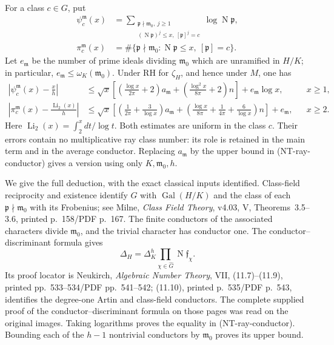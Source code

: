\documentclass[11pt,a4paper]{article}
\begin{document}
For a class $c\in G$, put
\begin{align*}
 \psi_c^{\mathfrak m}(x)
 &=\sum_{\substack{\mathfrak p\nmid\mathfrak m_0,\ j\ge1\\
           (\operatorname N\mathfrak p)^j\le x,\ [\mathfrak p]^j=c}}
                  \log\operatorname N\mathfrak p,\\
 \pi_c^{\mathfrak m}(x)
 &=\#\{\mathfrak p\nmid\mathfrak m_0:
             \operatorname N\mathfrak p\le x,\ [\mathfrak p]=c\}.
\end{align*}
Let $e_{\mathfrak m}$ be the number of prime ideals dividing
$\mathfrak m_0$ which are unramified in $H/K$; in particular,
$e_{\mathfrak m}\le\omega_K(\mathfrak m_0)$.
Under RH for $\zeta_H$, and hence under $M$, one has
\begin{align*}
 \left|\psi_c^{\mathfrak m}(x)-\frac{x}{h}\right|
 &\le\sqrt x\left[
       \left(\frac{\log x}{2\pi}+2\right)a_{\mathfrak m}
        +\left(\frac{\log^2x}{8\pi}+2\right)n\right]
       +e_{\mathfrak m}\log x,
       &&x\ge1,                                      \tag{NT-C06a}\\
 \left|\pi_c^{\mathfrak m}(x)-\frac{\operatorname{Li}_2(x)}h\right|
 &\le\sqrt x\left[
       \left(\frac1{2\pi}+\frac3{\log x}\right)a_{\mathfrak m}
       +\left(\frac{\log x}{8\pi}+\frac1{4\pi}
                         +\frac6{\log x}\right)n\right]
       +e_{\mathfrak m},
       &&x\ge2.                                      \tag{NT-C06b}
\end{align*}
Here $\operatorname{Li}_2(x)=\int_2^xdt/\log t$.
Both estimates are uniform in the class $c$.
Their errors contain no multiplicative ray class number: its role
is retained in the main term and in the average conductor.
Replacing $a_{\mathfrak m}$ by the upper bound in
(NT-ray-conductor) gives a version using only
$K,\mathfrak m_0,h$.

We give the full deduction, with the exact classical inputs identified.
Class-field reciprocity and existence identify $G$ with
$\operatorname{Gal}(H/K)$ and the class of each
$\mathfrak p\nmid\mathfrak m_0$ with its Frobenius;
see Milne, \emph{Class Field Theory}, v4.03, V, Theorems~3.5--3.6,
printed p.~158/PDF p.~167.  The finite conductors of the associated
characters divide $\mathfrak m_0$, and the trivial character has
conductor one.  The conductor--discriminant formula gives
\[
 \Delta_H=\Delta_K^h
              \prod_{\chi\in\widehat G}
                      \operatorname N\mathfrak f_\chi.
\]
Its proof locator is Neukirch, \emph{Algebraic Number Theory},
VII, (11.7)--(11.9), printed pp.~533--534/PDF pp.~541--542;
(11.10), printed p.~535/PDF p.~543, identifies the degree-one
Artin and class-field conductors.  The complete supplied proof of
the conductor--discriminant formula on those pages was read on
the original images.  Taking logarithms proves the equality in
(NT-ray-conductor).  Bounding each of the $h-1$ nontrivial
conductors by $\mathfrak m_0$ proves its upper bound.
\end{document}
